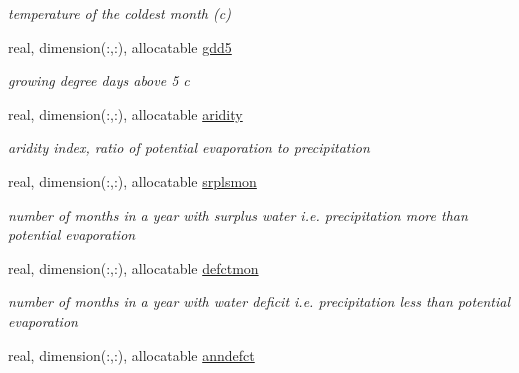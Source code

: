 \begin{DoxyCompactItemize}
\begin{DoxyCompactList}\small\item\em temperature of the coldest month (c) \end{DoxyCompactList}\item 
\hypertarget{structctem__statevars_1_1veg__rot_a3140ce2973ebae28290765d3a65d5268}{}real, dimension(\+:,\+:), allocatable \hyperlink{structctem__statevars_1_1veg__rot_a3140ce2973ebae28290765d3a65d5268}{gdd5}\label{structctem__statevars_1_1veg__rot_a3140ce2973ebae28290765d3a65d5268}

\begin{DoxyCompactList}\small\item\em growing degree days above 5 c \end{DoxyCompactList}\item 
\hypertarget{structctem__statevars_1_1veg__rot_aa2ff00c1f7a232377ab9908bf5bab3d7}{}real, dimension(\+:,\+:), allocatable \hyperlink{structctem__statevars_1_1veg__rot_aa2ff00c1f7a232377ab9908bf5bab3d7}{aridity}\label{structctem__statevars_1_1veg__rot_aa2ff00c1f7a232377ab9908bf5bab3d7}

\begin{DoxyCompactList}\small\item\em aridity index, ratio of potential evaporation to precipitation \end{DoxyCompactList}\item 
\hypertarget{structctem__statevars_1_1veg__rot_a9347babce6ccb6ed3aef3ddd157890cd}{}real, dimension(\+:,\+:), allocatable \hyperlink{structctem__statevars_1_1veg__rot_a9347babce6ccb6ed3aef3ddd157890cd}{srplsmon}\label{structctem__statevars_1_1veg__rot_a9347babce6ccb6ed3aef3ddd157890cd}

\begin{DoxyCompactList}\small\item\em number of months in a year with surplus water i.\+e. precipitation more than potential evaporation \end{DoxyCompactList}\item 
\hypertarget{structctem__statevars_1_1veg__rot_a74a0c09b59ea22655799cc0d43863e06}{}real, dimension(\+:,\+:), allocatable \hyperlink{structctem__statevars_1_1veg__rot_a74a0c09b59ea22655799cc0d43863e06}{defctmon}\label{structctem__statevars_1_1veg__rot_a74a0c09b59ea22655799cc0d43863e06}

\begin{DoxyCompactList}\small\item\em number of months in a year with water deficit i.\+e. precipitation less than potential evaporation \end{DoxyCompactList}\item 
\hypertarget{structctem__statevars_1_1veg__rot_a625e78b9e1439cba51708ef5f603f711}{}real, dimension(\+:,\+:), allocatable \hyperlink{structctem__statevars_1_1veg__rot_a625e78b9e1439cba51708ef5f603f711}{anndefct}\label{structctem__statevars_1_1veg__rot_a625e78b9e1439cba51708ef5f603f711}


\end{DoxyCompactItemize}
